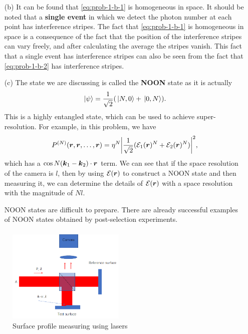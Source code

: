 \documentclass[hyperref, a4paper]{article}
\newcommand*{\concept}[1]{{\textbf{#1}}}
\begin{document}
\begin{itemize}
    \item[(b)] It can be found that \eqref{eq:prob-1-b-1} is homogeneous in space. It should be noted that a \concept{single event} 
    in which we detect the photon number at each point has interference stripes. The fact that \eqref{eq:prob-1-b-1} is homogeneous 
    in space is a consequence of the fact that the position of the interference stripes can vary freely, and after calculating the 
    average the stripes vanish. 
    This fact that a single event has interference stripes can also be seen from the fact that \eqref{eq:prob-1-b-2} has 
    interference stripes. 
    \item[(c)] The state we are discussing is called the \concept{NOON} state as it is actually 
    \begin{equation}
        \ket*{\psi} = \frac{1}{\sqrt{2}} (\ket*{N, 0} + \ket*{0, N}).
    \end{equation} 
    This is a highly entangled state, which can be used to achieve super-resolution. For example, in this problem, 
    we have 
    \begin{equation}
        P^{(N)}(\vb*{r}, \vb*{r}, \ldots , \vb*{r}) = \eta^N \abs{\frac{1}{\sqrt{2}} ({\mathcal{E}}_1(\vb*{r})^N + {\mathcal{E}}_2(\vb*{r})^N )}^2,
    \end{equation}
    which has a $\cos N (\vb*{k}_1 - \vb*{k}_2) \cdot \vb*{r}$ term. We can see that if the space resolution of the camera 
    is $l$, then by using $\mathcal{E}(\vb*{r})$ to construct a NOON state and then measuring it, we can determine the details 
    of $\mathcal{E}(\vb*{r})$ with a space resolution with the magnitude of $N l$.

    NOON states are difficult to prepare. There are already successful examples of NOON states obtained by post-selection experiments.
\end{itemize}

\paragraph{}

\begin{figure}
    \centering
    \includegraphics[width=0.5\textwidth]{problem-2.png}
    \caption{Surface profile measuring using lasers}
    \label{fig:prob-2}
\end{figure}
\end{document}
